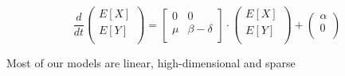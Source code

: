 \documentclass{beamer}
\begin{document}
\begin{frame}
    \begin{equation*}
        \frac{d}{dt} 
        \begin{pmatrix}
            E[X] \\
            E[Y] \\
        \end{pmatrix}
        = 
        \begin{bmatrix}
            0 & 0 \\
            \mu & \beta - \delta \\
        \end{bmatrix}
        \cdot
        \begin{pmatrix}
            E[X] \\
            E[Y] \\
        \end{pmatrix}
        +
        \begin{pmatrix}
            \alpha \\
            0 \\
        \end{pmatrix}
    \end{equation*}

\begin{center}
    \small{Most of our models are linear, high-dimensional and sparse\footnotemark}
\end{center}
\end{frame}
\end{document}
